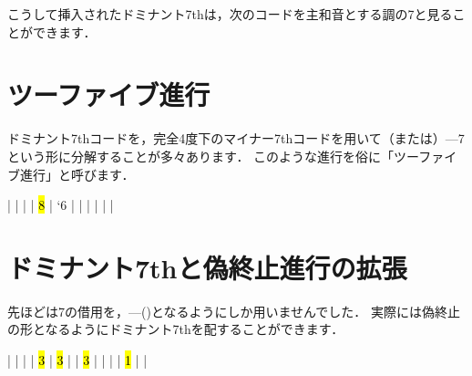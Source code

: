 \documentclass[dvipdfmx,uplatex,b5paper,openany,jbase=12Q,nomag*,textwidth-limit=44%
               ]{gachimuchi}[2020/05/05]
\begin{document}
こうして挿入されたドミナント7thは，次のコードを主和音とする調の\Gnv\subsc7と見ることができます．

\section{ツーファイブ進行}
ドミナント7thコードを，完全4度下のマイナー7thコードを用いて\Gnii\Min{}（または\Gnii \hDim{}）---\Gnv\subsc7という形に分解することが多々あります．
このような進行を俗に「ツーファイブ進行」と呼びます．
\begin{Music}
  \generalmeter{\meterC}%
  \Startpiece
  \NOTes%
  |\en%
  \NOtes%
  |%
  \en%
  \bar%
  \NOTes%
  |%
  \hl{8}\en%
  \NOtes%
  |%
  \lq{6}%
  \en%
  \bar%
  \NOtes%
  \sk%
  |%
  \en%
  \bar%
  \NOTEs%
  |%
  \en%
  \bar%
  \NOTEs%
  |%
  \en%
  \setdoubleBAR\endpiece
\end{Music}
\section{ドミナント7thと偽終止進行の拡張}
先ほどは\Gnv 7の借用を，\Gnv{}---\Gni(\Min)となるようにしか用いませんでした．
実際には偽終止の形となるようにドミナント7thを配することができます．

\begin{Music}
  \generalmeter{\meterC}%
  \Startpiece%
  \NOTes%
  |%
  \en%
  \NOTes%
  |%
  \en%
  \bar%
  \NOTes%
  \lrchordsl{[&\Funktion{Tp}]}|%
  \hl{3}\en%
  \NOTes%
  |%
  \hl{3}\en%
  \bar%
  \NOTes%
  |%
  \hl{3}\en%
  \NOTes%
  |%
  \en%
  \bar%
  \NOTes%
  |%
  \en%
  \NOTes%
  |%
  \hl{1}\en%
  \bar%
  \NOTEs%
  |%
  \en%
  \setdoubleBAR\endpiece
\end{Music}
\end{document}
